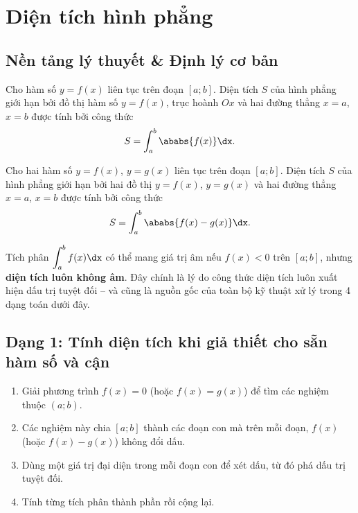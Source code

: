 \section{Diện tích hình phẳng}

\subsection{Nền tảng lý thuyết \& Định lý cơ bản}

\begin{hopdinhly}[Định lý]
Cho hàm số $y=f(x)$ liên tục trên đoạn $[a;b]$. Diện tích $S$ của hình phẳng giới hạn bởi đồ thị hàm số $y=f(x)$, trục hoành $Ox$ và hai đường thẳng $x=a$, $x=b$ được tính bởi công thức
\[
S = \int_a^b \ababs{f(x)} \dx.
\]
\end{hopdinhly}

\begin{center}
\end{center}

\begin{hopdinhly}[Định lý]
Cho hai hàm số $y=f(x)$, $y=g(x)$ liên tục trên đoạn $[a;b]$. Diện tích $S$ của hình phẳng giới hạn bởi hai đồ thị $y=f(x)$, $y=g(x)$ và hai đường thẳng $x=a$, $x=b$ được tính bởi công thức
\[
S = \int_a^b \ababs{f(x)-g(x)} \dx.
\]
\end{hopdinhly}

\begin{center}
\end{center}

\begin{hopchuy}
Tích phân $\displaystyle\int_a^b f(x)\dx$ có thể mang giá trị âm nếu $f(x)<0$ trên $[a;b]$, nhưng \textbf{diện tích luôn không âm}. Đây chính là lý do công thức diện tích luôn xuất hiện dấu trị tuyệt đối -- và cũng là nguồn gốc của toàn bộ kỹ thuật xử lý trong 4 dạng toán dưới đây.
\end{hopchuy}

\newpage
\subsection{Dạng 1: Tính diện tích khi giả thiết cho sẵn hàm số và cận}

\begin{hopphuongphap}
\begin{enumerate}[leftmargin=1cm]
  \item Giải phương trình $f(x)=0$ (hoặc $f(x)=g(x)$) để tìm các nghiệm thuộc $(a;b)$.
  \item Các nghiệm này chia $[a;b]$ thành các đoạn con mà trên mỗi đoạn, $f(x)$ (hoặc $f(x)-g(x)$) không đổi dấu.
  \item Dùng một giá trị đại diện trong mỗi đoạn con để xét dấu, từ đó phá dấu trị tuyệt đối.
  \item Tính từng tích phân thành phần rồi cộng lại.
\end{enumerate}
\end{hopphuongphap}


